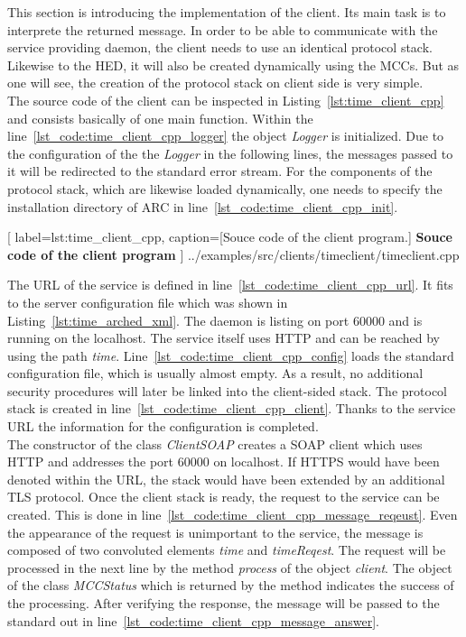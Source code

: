 This section is introducing the implementation of the client.
Its main task is to interprete the returned message.
In order to be able to communicate with the service providing daemon, the client needs to use an identical protocol stack.
Likewise to the HED, it will also be created dynamically using the MCCs.
But as one will see, the creation of the protocol stack on client side is very simple.\\

The source code of the client can be inspected in Listing~\ref{lst:time_client_cpp} and consists basically of one main function.
Within the line~\ref{lst_code:time_client_cpp_logger} the object \textit{Logger} is initialized.
Due to the configuration of the the \textit{Logger} in the following lines, the messages passed to it will be redirected to the standard error stream.  For the components of the protocol stack, which  are likewise loaded dynamically, one needs to specify the installation directory of ARC in line~\ref{lst_code:time_client_cpp_init}.\\

	[
	label=lst:time_client_cpp,
	caption={[Souce code of the client program.]
	\textbf{Souce code of the client program}}
	]
{../examples/src/clients/timeclient/timeclient.cpp}
 

The URL of the service is defined in line~\ref{lst_code:time_client_cpp_url}.
It fits to the server configuration file which was shown in Listing~\ref{lst:time_arched_xml}.
The daemon is listing on port 60000 and is running on the localhost. The service itself uses HTTP and can be reached by using the path \textit{time}.
Line~\ref{lst_code:time_client_cpp_config} loads the standard configuration file, which is usually almost empty.
As a result, no additional security procedures will later be linked into the client-sided stack. 
The protocol stack is created in line~\ref{lst_code:time_client_cpp_client}. 
Thanks to the service URL the information for the configuration is completed.\\


The constructor of the class \textit{ClientSOAP} creates a SOAP client which uses HTTP and addresses the port 60000 on localhost.
If HTTPS would have been denoted within the URL, the stack would have been extended by an additional TLS protocol.
Once the client stack is ready, the request to the service can be created.
This is done in line~\ref{lst_code:time_client_cpp_message_reqeust}.
Even the appearance of the request is unimportant to the service, the message is composed of two convoluted elements \textit{time} and \textit{timeReqest}. 
The request will be processed in the next line by the method \textit{process} of the object \textit{client}. %
The object of the class \textit{MCCStatus} which is returned by the method indicates the success of the processing.
After verifying the response, the message will be passed to the standard out in line~\ref{lst_code:time_client_cpp_message_answer}. \\


